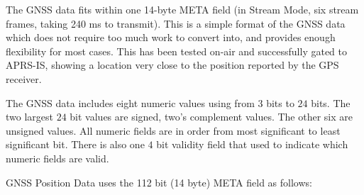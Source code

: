 \documentclass[a4paper,11pt,oneside]{book}
\begin{document}
The GNSS data fits within one 14-byte META field (in Stream Mode, six stream frames, taking 240 ms to transmit). This is a simple format of the GNSS data which does not require too much work to convert into, and provides enough flexibility for most cases. This has been tested on-air and successfully gated to APRS-IS, showing a location very close to the position reported by the GPS receiver.

The GNSS data includes eight numeric values using from $3$ bits to $24$ bits. The two largest $24$ bit values are signed, two's complement values. The other six are unsigned values. All numeric fields are in order from most significant to least significant bit. There is also one $4$ bit validity field that used to indicate which numeric fields are valid.

GNSS Position Data uses the 112 bit (14 byte) META field as follows:
\end{document}
